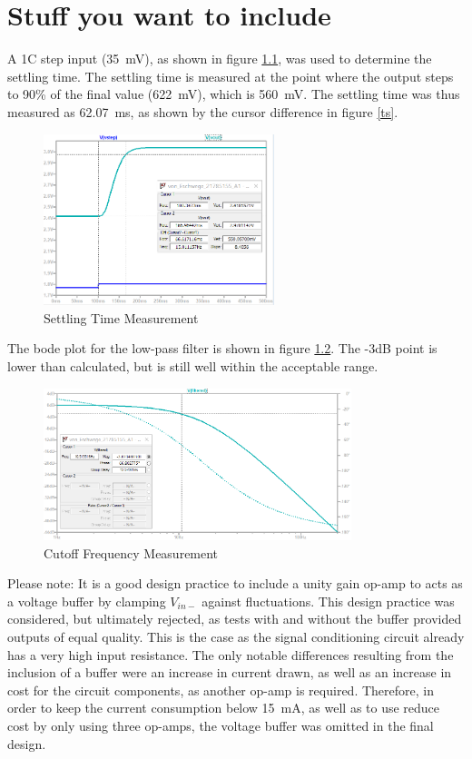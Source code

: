      \chapter{Stuff you want to include}

A 1\degree C step input (\SI{35}{\milli\volt}), as shown in figure \ref{fig:ts}, was used to determine the settling time. The settling time is measured at the point where the output steps to 90\% of the final value (\SI{622}{\milli\volt}), which is \SI{560}{\milli\volt}. The settling time was thus measured as \SI{62.07}{ms}, as shown by the cursor difference in figure \ref{ts}.
\begin{figure}[h]
    \centering
    \includegraphics[width = 0.6\textwidth]{Figures/ts.png}
    \caption{Settling Time Measurement}
    \label{fig:ts}
\end{figure}

The bode plot for the low-pass filter is shown in figure \ref{fig:ac}. The -3dB point is lower than calculated, but is still well within the acceptable range. 
\begin{figure}[h]
    \centering
    \includegraphics[width = 0.8\textwidth]{Figures/ac.png}
    \caption{Cutoff Frequency Measurement}
    \label{fig:ac}
\end{figure}

Please note:
It is a good design practice to include a unity gain op-amp to acts as a voltage buffer by clamping $V_{in-}$ against fluctuations. This design practice was considered, but ultimately rejected, as tests with and without the buffer provided outputs of equal quality. This is the case as the signal conditioning circuit already has a very high input resistance. The only notable differences resulting from the inclusion of a buffer were an increase in current drawn, as well as an increase in cost for the circuit components, as another op-amp is required. Therefore, in order to keep the current consumption below \SI{15}{mA}, as well as to use reduce cost by only using three op-amps, the voltage buffer was omitted in the final design.\\